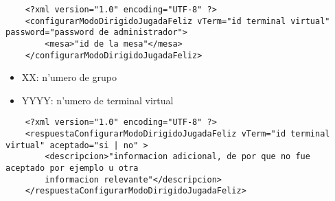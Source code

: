 \begin{verbatim}
    <?xml version="1.0" encoding="UTF-8" ?>
    <configurarModoDirigidoJugadaFeliz vTerm="id terminal virtual" password="password de administrador">
        <mesa>"id de la mesa"</mesa>
    </configurarModoDirigidoJugadaFeliz>
\end{verbatim}


 
\begin{itemize}
    \item{XX: n'umero de grupo}
    \item{YYYY: n'umero de terminal virtual}
\end{itemize}

\begin{verbatim}
    <?xml version="1.0" encoding="UTF-8" ?>
    <respuestaConfigurarModoDirigidoJugadaFeliz vTerm="id terminal virtual" aceptado="si | no" >
        <descripcion>"informacion adicional, de por que no fue aceptado por ejemplo u otra
        informacion relevante"</descripcion>
    </respuestaConfigurarModoDirigidoJugadaFeliz>
\end{verbatim}
